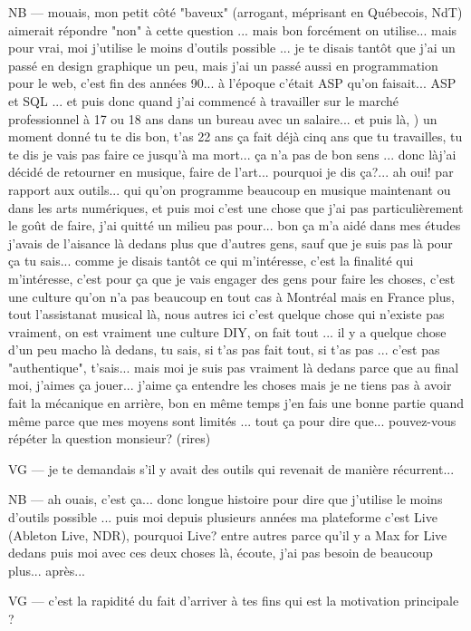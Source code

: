 NB — mouais, mon petit côté "baveux" (arrogant, méprisant en Québecois, NdT) aimerait répondre "non" à cette question ... mais bon forcément on utilise... mais pour vrai, moi j'utilise le moins d'outils possible ... je te disais tantôt que j'ai un passé en design graphique un peu, mais j'ai un passé aussi en programmation pour le web, c'est fin des années 90... à l'époque c'était \gls{ASP} qu'on faisait... ASP et SQL ... et puis donc quand j'ai commencé à travailler sur le marché professionnel à 17 ou 18 ans dans un bureau avec un salaire... et puis là, ) un moment donné tu te dis bon, t'as 22 ans ça fait déjà cinq ans que tu travailles, tu te dis je vais pas faire ce jusqu'à ma mort... ça n'a pas de bon sens ... donc làj'ai décidé de retourner en musique, faire de l'art... pourquoi je dis ça?... ah oui! par rapport aux outils... qui qu'on programme beaucoup en musique maintenant ou dans les arts numériques, et puis moi c'est une chose que j'ai pas particulièrement le goût de faire, j'ai quitté un milieu pas pour... bon ça m'a aidé dans mes études j'avais de l'aisance là dedans plus que d'autres gens, sauf que je suis pas là pour ça tu sais... comme je disais tantôt ce qui m'intéresse, c'est la finalité qui m'intéresse, c'est pour ça que je vais engager des gens pour faire les choses, c'est une culture qu'on n'a pas beaucoup en tout cas à Montréal mais en France plus, tout l'assistanat musical là, nous autres ici c'est quelque chose qui n'existe pas vraiment, on est vraiment une culture \gls{DIY}, on fait tout ... il y a quelque chose d'un peu macho là dedans, tu sais, si t'as pas fait tout, si t'as pas ...  c'est pas "authentique", t'sais... mais moi je suis pas vraiment là dedans parce que au final moi, j'aimes ça jouer... j'aime ça entendre les choses mais je ne tiens pas à avoir fait la mécanique en arrière, bon en même temps j'en fais une bonne partie quand même parce que mes moyens sont limités ... tout ça pour dire que... pouvez-vous répéter la question monsieur? (rires)

VG — je te demandais s'il y avait des outils qui revenait de manière récurrent...

NB — ah ouais, c'est ça...  donc longue histoire pour dire que j'utilise le moins d'outils possible ... puis moi depuis plusieurs années ma plateforme c'est Live (Ableton Live, NDR), pourquoi Live? entre autres parce qu'il y a Max for Live dedans puis moi avec ces deux choses là, écoute, j'ai pas besoin de beaucoup plus... après... 

VG — c'est la rapidité du fait d'arriver à tes fins qui est la motivation principale ?

